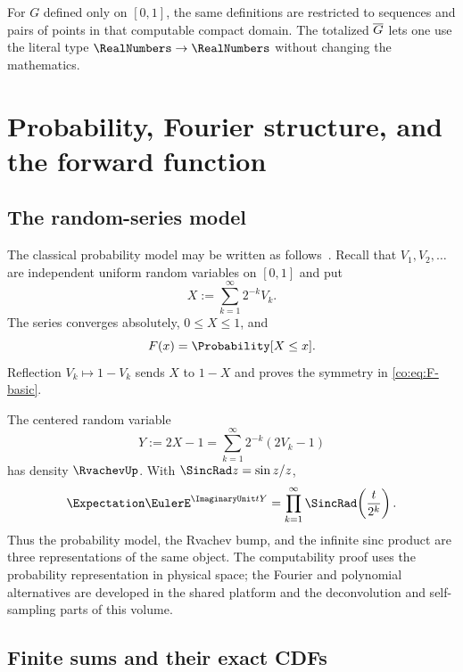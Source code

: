 For $G$ defined only on $[0,1]$, the same definitions are restricted to
sequences and pairs of points in that computable compact domain.  The totalized
$\overline G$ lets one use the literal type $\RealNumbers\to\RealNumbers$ without changing the
mathematics.

\section{Probability, Fourier structure, and the forward function}
\label{co:sec:forward}

\subsection{The random-series model}

The classical probability model may be written as follows\ \cite{is:p1:Fabius1966,is:p1:Arias1982,is:p1:ProveItPrimary}.  Recall that $V_1,V_2,\ldots$ are independent uniform random variables on $[0,1]$ and
put
\begin{equation}\label{co:eq:random-series}
 X:=\sum_{k=1}^{\infty}2^{-k}V_k.
\end{equation}
The series converges absolutely, $0\le X\le1$, and
\begin{equation}\label{co:eq:F-cdf}
 F(x)=\Probability[X\le x].
\end{equation}
Reflection $V_k\mapsto1-V_k$ sends $X$ to $1-X$ and proves the symmetry in
\eqref{co:eq:F-basic}.

The centered random variable
\begin{equation}\label{co:eq:centered-random}
 Y:=2X-1=\sum_{k=1}^{\infty}2^{-k}(2V_k-1)
\end{equation}
has density $\RvachevUp$.  With $\SincRad z=\sin z/z$,
\begin{equation}\label{co:eq:sinc-product}
 \Expectation\EulerE^{\ImaginaryUnit tY}
 =\prod_{k=1}^{\infty}\SincRad\!\left(\frac{t}{2^k}\right).
\end{equation}
Thus the probability model, the Rvachev bump, and the infinite sinc product
are three representations of the same object.  The computability proof uses
the probability representation in physical space; the Fourier and polynomial
alternatives are developed in the shared platform and the deconvolution and
self-sampling parts of this volume.

\subsection{Finite sums and their exact CDFs}

